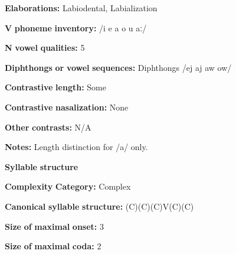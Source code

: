 \documentclass[output=paper]{langsci/langscibook}
\begin{document}
\begin{styleBody}
\textbf{Elaborations:} Labiodental, Labialization
\end{styleBody}

\begin{styleBody}
\textbf{V} \textbf{phoneme} \textbf{inventory:} /i e a o u aː/
\end{styleBody}

\begin{styleBody}
\textbf{N} \textbf{vowel} \textbf{qualities:} 5
\end{styleBody}

\begin{styleBody}
\textbf{Diphthongs} \textbf{or} \textbf{vowel} \textbf{sequences:} Diphthongs /ej aj aw ow/
\end{styleBody}

\begin{styleBody}
\textbf{Contrastive} \textbf{length:} Some
\end{styleBody}

\begin{styleBody}
\textbf{Contrastive} \textbf{nasalization:} None
\end{styleBody}

\begin{styleBody}
\textbf{Other} \textbf{contrasts:} N/A
\end{styleBody}

\begin{styleBody}
\textbf{Notes:} Length distinction for /a/ only.
\end{styleBody}

\begin{styleBody}
\textbf{Syllable} \textbf{structure}
\end{styleBody}

\begin{styleBody}
\textbf{Complexity} \textbf{Category:} Complex
\end{styleBody}

\begin{styleBody}
\textbf{Canonical} \textbf{syllable} \textbf{structure:} (C)(C)(C)V(C)(C) \citep[41-8]{Lacrampe2014}
\end{styleBody}

\begin{styleBody}
\textbf{Size} \textbf{of} \textbf{maximal} \textbf{onset:} 3
\end{styleBody}

\begin{styleBody}
\textbf{Size} \textbf{of} \textbf{maximal} \textbf{coda:} 2
\end{styleBody}
\end{document}
